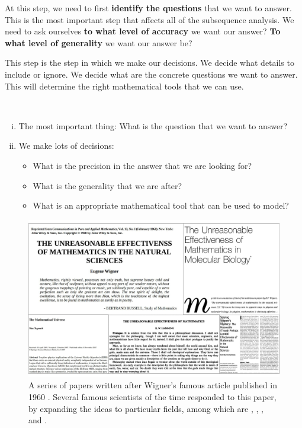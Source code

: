 At this step, we need to first \textbf{identify the questions} that we want to answer. This is the most important step that affects all of the subsequence analysis. We need to ask ourselves \textbf{to what level of accuracy} we want our answer? \textbf{To what level of generality} we want our answer be?

This step is the step in which we make our decisions. We decide what details to include or ignore. We decide what are the concrete questions we want to answer. This will determine the right mathematical tools that we can use. 

\begin{summary}
	$ \; $
	\begin{enumerate}[(i)]
		\item The most important thing: What is the question that we want to answer?
		\item We make lots of decisions:
		\begin{itemize}
			\item What is the precision in the answer that we are looking for?
			\item What is the generality that we are after?
			\item What is an appropriate mathematical tool that can be used to model?
		\end{itemize}
		
	\end{enumerate}
\end{summary}

\begin{figure}
	\centering
	\captionsetup{width=.9\linewidth}
	\includegraphics[width=1\linewidth]{images/EffectinvenessOFMath.pdf}
	\caption{A series of papers written after Wigner's famous article published in 1960 \cite{Wigner1995}. Several famous scientists of the time responded to this paper, by expanding the ideas to particular fields, among which are \cite{Hamming1980},  \cite{Lesk2000},  \cite{Tegmark2008}, and \cite{GrattanGuinness2008}. }
	\label{fig:mathmodelingmatheffectiveness}
\end{figure}

